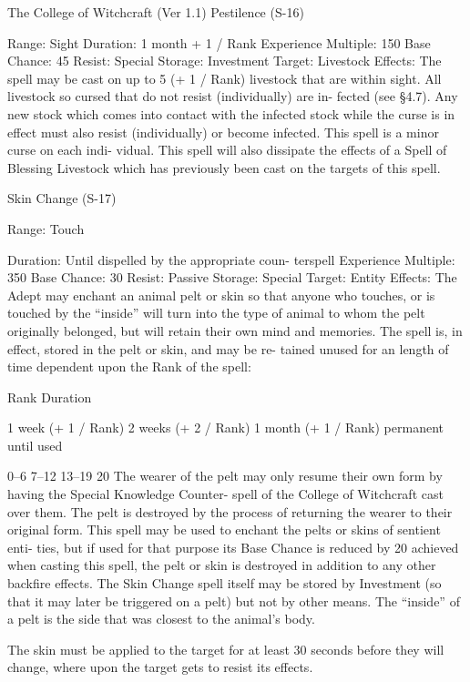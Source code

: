 \begin{Chapter}{The College of Witchcraft (Ver 1.1)}
Pestilence (S-16) 

Range: Sight 
Duration: 1 month + 1 / Rank 
Experience Multiple: 150 
Base Chance: 45%
Resist: Special 
Storage: Investment 
Target: Livestock 
Effects:  The  spell  may  be  cast  on  up  to  5  (+  1  / 
Rank) livestock that are within sight. All livestock 
so  cursed  that  do  not  resist  (individually)  are  in-
fected (see §4.7). Any new stock which comes into 
contact with the infected stock while the curse is in 
effect  must  also  resist  (individually)  or  become 
infected.  This  spell  is  a  minor  curse  on  each  indi-
vidual. This spell will also dissipate the effects of a 
Spell  of  Blessing  Livestock  which  has  previously 
been cast on the targets of this spell. 

Skin Change (S-17) 

Range: Touch 

Duration: Until dispelled by the appropriate coun-
terspell 
Experience Multiple: 350 
Base Chance: 30%
Resist: Passive 
Storage: Special 
Target: Entity 
Effects:  The  Adept  may  enchant  an  animal  pelt  or 
skin so that anyone  who touches, or  is touched by 
the  “inside”  will  turn  into  the  type  of  animal  to 
whom  the  pelt  originally  belonged,  but  will  retain 
their  own  mind  and  memories.  The  spell  is,  in 
effect,  stored  in  the  pelt  or  skin,  and  may  be  re-
tained unused for an length of time dependent upon 
the Rank of the spell: 

Rank  Duration 

1 week (+ 1 / Rank) 
2 weeks (+ 2 / Rank) 
1 month (+ 1 / Rank) 
permanent until used 

0–6 
7–12 
13–19 
20 
The wearer of the pelt may only resume their own 
form  by  having  the  Special  Knowledge  Counter-
spell  of  the  College  of  Witchcraft  cast  over  them. 
The  pelt  is  destroyed  by  the  process  of  returning 
the wearer to their original form. This spell may be 
used  to  enchant  the  pelts  or  skins  of  sentient  enti-
ties, but if used for that purpose its Base Chance is 
reduced  by  20%
achieved when casting this spell, the pelt or skin is 
destroyed in addition to any other backfire effects. 
The  Skin  Change  spell  itself  may  be  stored  by 
Investment  (so  that  it  may  later  be  triggered  on  a 
pelt) but not by other means. The “inside” of a pelt 
is the side that was closest to the animal’s body. 

The  skin  must  be  applied  to  the  target  for  at  least 
30  seconds  before  they  will  change,  where  upon 
the target gets to resist its effects. 


\end{Chapter}
